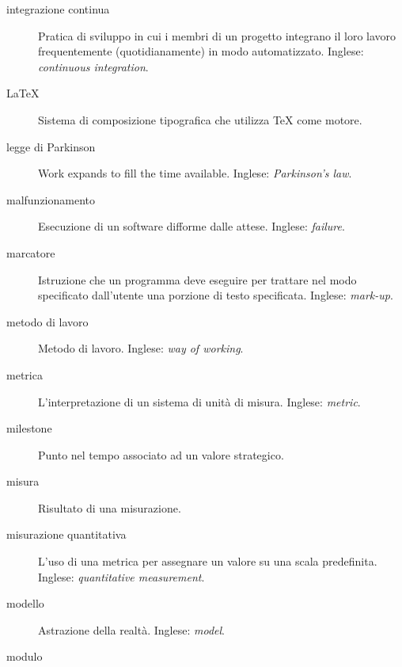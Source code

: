 \documentclass[a4paper]{article}
\begin{document}
\begin{description}
	\item[integrazione continua] 

			Pratica di sviluppo in cui i membri di un progetto integrano il loro lavoro frequentemente (quotidianamente) in modo automatizzato. Inglese: \emph{continuous integration}.
			
	\item[LaTeX] 

			Sistema di composizione tipografica che utilizza TeX come motore.
			
	\item[legge di Parkinson] 

			Work expands to fill the time available. Inglese: \emph{Parkinson's law}.
			
	\item[malfunzionamento] 

			Esecuzione di un software difforme dalle attese. Inglese: \emph{failure}.
			
	\item[marcatore] 

			Istruzione che un programma deve eseguire per trattare nel modo specificato dall'utente una porzione di testo specificata. Inglese: \emph{mark-up}.
			
	\item[metodo di lavoro] 

			Metodo di lavoro. Inglese: \emph{way of working}.
			
	\item[metrica] 

			L'interpretazione di un sistema di unità di misura. Inglese: \emph{metric}.
			
	\item[milestone] 

			Punto nel tempo associato ad un valore strategico.
			
	\item[misura] 

			Risultato di una misurazione.
			
	\item[misurazione quantitativa] 

			L'uso di una metrica per assegnare un valore su una scala predefinita. Inglese: \emph{quantitative measurement}.
			
	\item[modello] 

			Astrazione della realtà. Inglese: \emph{model}.
			
	\item[modulo] 


\end{description}
\end{document}
